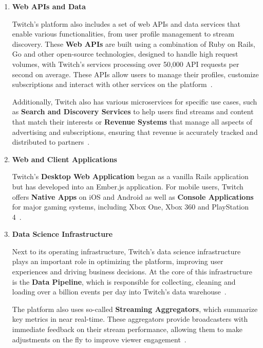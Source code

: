 \begin{enumerate}
    \item \textbf{Web \ac{API}s and Data}

    Twitch’s platform also includes a set of web \ac{API}s and data services that enable various functionalities, from user profile management to stream discovery. These \textbf{Web \ac{API}s} are built using a combination of Ruby on Rails, Go and other open-source technologies, designed to handle high request volumes, with Twitch's services processing over 50,000 \ac{API} requests per second on average. These \ac{API}s allow users to manage their profiles, customize subscriptions and interact with other services on the platform~\parencite{twitch_engineering}.

    Additionally, Twitch also has various microservices for specific use cases, such as \textbf{Search and Discovery Services} to help users find streams and content that match their interests or \textbf{Revenue Systems} that manage all aspects of advertising and subscriptions, ensuring that revenue is accurately tracked and distributed to partners~\parencite{twitch_engineering}. 
    
    \item \textbf{Web and Client Applications}
    
    Twitch’s \textbf{Desktop Web Application} began as a vanilla Rails application but has developed into an Ember.js application. For mobile users, Twitch offers \textbf{Native Apps} on iOS and Android as well as \textbf{Console Applications} for major gaming systems, including Xbox One, Xbox 360 and PlayStation 4~\parencite{twitch_engineering}.

    \item \textbf{Data Science Infrastructure}

    Next to its operating infrastructure, Twitch’s data science infrastructure plays an important role in optimizing the platform, improving user experiences and driving business decisions. At the core of this infrastructure is the \textbf{Data Pipeline}, which is responsible for collecting, cleaning and loading over a billion events per day into Twitch’s data warehouse~\parencite{twitch_engineering}. 

    The platform also uses so-called \textbf{Streaming Aggregators}, which summarize key metrics in near real-time. These aggregators provide broadcasters with immediate feedback on their stream performance, allowing them to make adjustments on the fly to improve viewer engagement~\parencite{twitch_engineering}.


\end{enumerate}
